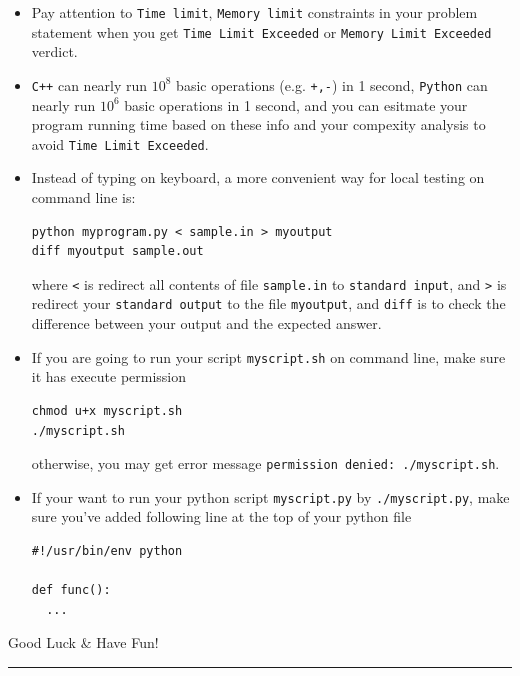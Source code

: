 \documentclass[
]{article}
\begin{document}
\begin{itemize}
\item
  Pay attention to \texttt{Time\ limit}, \texttt{Memory\ limit}
  constraints in your problem statement when you get
  \texttt{Time\ Limit\ Exceeded} or \texttt{Memory\ Limit\ Exceeded}
  verdict.
\item
  \texttt{C++} can nearly run \( 10^8\) basic operations (e.g.
  \texttt{+,-}) in 1 second, \texttt{Python} can nearly run \(10^6\)
  basic operations in 1 second, and you can esitmate your program
  running time based on these info and your compexity analysis to avoid
  \texttt{Time\ Limit\ Exceeded}.

\item Instead of typing on keyboard, a more convenient way for local testing on command line is:

\begin{verbatim}
python myprogram.py < sample.in > myoutput
diff myoutput sample.out
\end{verbatim}
    where \texttt{<} is redirect all contents of file \texttt{sample.in} to \texttt{standard input}, and \texttt{>} is redirect your \texttt{standard output} to the file \texttt{myoutput},
    and \texttt{diff} is to check the difference between your output and the expected answer.

\item
  If you are going to run your script \texttt{myscript.sh} on command line, make sure it has execute permission
  \begin{verbatim}
chmod u+x myscript.sh
./myscript.sh
  \end{verbatim}
otherwise, you may get error message \texttt{permission denied: ./myscript.sh}.

\item
  If your want to run your python script \texttt{myscript.py} by \texttt{./myscript.py},
    make sure you've added following line at the top of your python file
\begin{verbatim}
#!/usr/bin/env python

def func():
  ...
\end{verbatim}
\end{itemize}

\huge Good Luck \& Have Fun!
\begin{center}\rule{0.5\linewidth}{\linethickness}\end{center}
\end{document}
